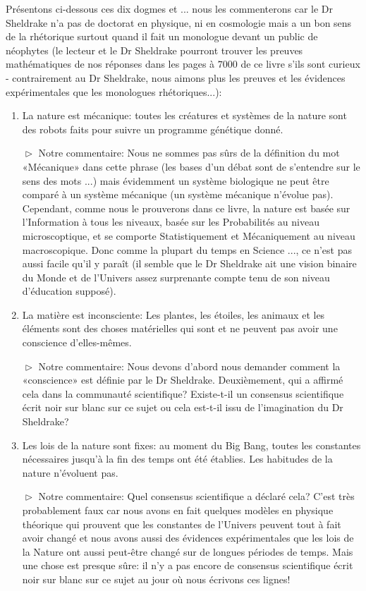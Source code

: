	Présentons ci-dessous ces dix dogmes et ... nous les commenterons car le Dr Sheldrake n'a pas de doctorat en physique, ni en cosmologie mais a un bon sens de la rhétorique surtout quand il fait un monologue devant un public de néophytes (le lecteur et le Dr Sheldrake pourront trouver les preuves mathématiques de nos réponses dans les pages à $7000$ de ce livre s'ils sont curieux - contrairement au Dr Sheldrake, nous aimons plus les preuves et les évidences expérimentales que les monologues rhétoriques...):
	\begin{enumerate}
		\item \og La nature est mécanique: toutes les créatures et systèmes de la nature sont des robots faits pour suivre un programme génétique donné. \fg{}
		
		$\vartriangleright$ Notre commentaire: Nous ne sommes pas sûrs de la définition du mot «Mécanique» dans cette phrase (les bases d'un débat sont de s'entendre sur le sens des mots ...) mais évidemment un système biologique ne peut être comparé à un système mécanique (un système mécanique n'évolue pas). Cependant, comme nous le prouverons dans ce livre, la nature est basée sur l'Information à tous les niveaux, basée sur les Probabilités au niveau microscoptique, et se comporte Statistiquement et Mécaniquement au niveau macroscopique. Donc comme la plupart du temps en Science ..., ce n'est pas aussi facile qu'il y paraît (il semble que le Dr Sheldrake ait une vision binaire du Monde et de l'Univers assez surprenante compte tenu de son niveau d'éducation supposé).
		
		\item \og La matière est inconsciente: Les plantes, les étoiles, les animaux et les éléments sont des choses matérielles qui sont et ne peuvent pas avoir une conscience d'elles-mêmes.\fg{}
		
		$\vartriangleright$ Notre commentaire: Nous devons d'abord nous demander comment la «conscience» est définie par le Dr Sheldrake. Deuxièmement, qui a affirmé cela dans la communauté scientifique? Existe-t-il un consensus scientifique écrit noir sur blanc sur ce sujet ou cela est-t-il issu de l'imagination du Dr Sheldrake?

		\item \og Les lois de la nature sont fixes: au moment du Big Bang, toutes les constantes nécessaires jusqu'à la fin des temps ont été établies. Les habitudes de la nature n'évoluent pas.\fg{}
		
		$\vartriangleright$ Notre commentaire: Quel consensus scientifique a déclaré cela? C'est très probablement faux car nous avons en fait quelques modèles en physique théorique qui prouvent que les constantes de l'Univers peuvent tout à fait avoir changé et nous avons aussi des évidences expérimentales que les lois de la Nature ont aussi peut-être changé sur de longues périodes de temps. Mais une chose est presque sûre: il n'y a pas encore de consensus scientifique écrit noir sur blanc sur ce sujet au jour où nous écrivons ces lignes!


\end{enumerate}
